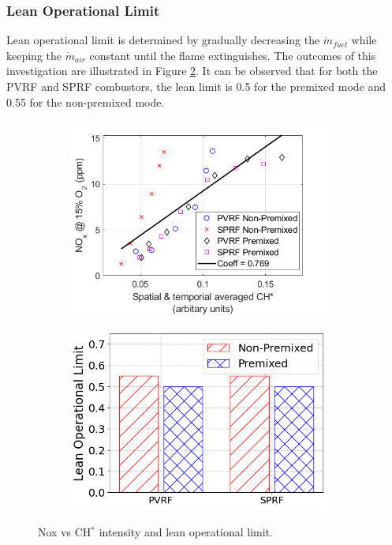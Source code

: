\subsubsection{Lean Operational Limit}
Lean operational limit is determined by gradually decreasing the $\dot{m}_{fuel}$ while keeping the $\dot{m}_{air}$ constant until the flame extinguishes. The outcomes of this investigation are illustrated in Figure \ref{fig:LOL}. It can be observed that for both the PVRF and SPRF combustors, the lean limit is 0.5 for the premixed mode and 0.55 for the non-premixed mode.
\begin{figure}[t]
    \begin{subfigure}[t]{0.5\textwidth}
        \centering
	\includegraphics[width=0.95\textwidth]{Chapter5/Images/Experimental/Emissions/NOxVsCHs.png}
	\label{fig:NoxVsCo CHs}
    \end{subfigure}
    \begin{subfigure}[t]{0.5\textwidth}
        \centering
	\includegraphics[width=0.95\textwidth]{Chapter5/Images/Experimental/Emissions/LoL.png}
	\label{fig:LOL}
    \end{subfigure}
\caption{Nox vs CH$^*$ intensity and lean operational limit.}
\label{fig:NOxChsansLOL}
\end{figure}
